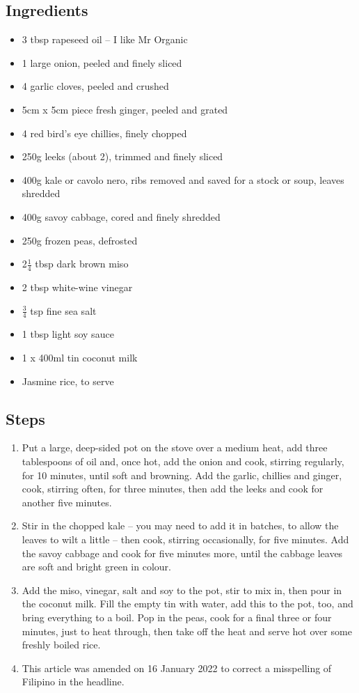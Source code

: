 \documentclass{book}
\begin{document}
\subsection*{Ingredients}
\begin{itemize}
\item 3 tbsp rapeseed oil – I like Mr Organic
\item 1 large onion, peeled and finely sliced
\item 4 garlic cloves, peeled and crushed
\item 5cm x 5cm piece fresh ginger, peeled and grated
\item 4 red bird’s eye chillies, finely chopped
\item 250g leeks (about 2), trimmed and finely sliced
\item 400g kale or cavolo nero, ribs removed and saved for a stock or soup, leaves shredded
\item 400g savoy cabbage, cored and finely shredded
\item 250g frozen peas, defrosted
\item 2$\frac{1}{4}$ tbsp dark brown miso
\item 2 tbsp white-wine vinegar
\item $\frac{3}{4}$ tsp fine sea salt
\item 1 tbsp light soy sauce
\item 1 x 400ml tin coconut milk
\item Jasmine rice, to serve
\end{itemize}

\subsection*{Steps}
\begin{enumerate}
\item Put a large, deep-sided pot on the stove over a medium heat, add three tablespoons of oil and, once hot, add the onion and cook, stirring regularly, for 10 minutes, until soft and browning. Add the garlic, chillies and ginger, cook, stirring often, for three minutes, then add the leeks and cook for another five minutes.
\item Stir in the chopped kale – you may need to add it in batches, to allow the leaves to wilt a little – then cook, stirring occasionally, for five minutes. Add the savoy cabbage and cook for five minutes more, until the cabbage leaves are soft and bright green in colour.
\item Add the miso, vinegar, salt and soy to the pot, stir to mix in, then pour in the coconut milk. Fill the empty tin with water, add this to the pot, too, and bring everything to a boil. Pop in the peas, cook for a final three or four minutes, just to heat through, then take off the heat and serve hot over some freshly boiled rice.
\item  This article was amended on 16 January 2022 to correct a misspelling of Filipino in the headline.
\end{enumerate}
\newpage
\end{document}

